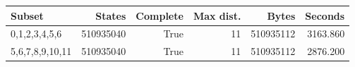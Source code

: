{\small
\begin{tabular}{lrrrrr}
\hline
Subset & States & Complete & Max dist. & Bytes & Seconds \\
\hline
0,1,2,3,4,5,6 & 510935040 & True & 11 & 510935112 & 3163.860 \\
5,6,7,8,9,10,11 & 510935040 & True & 11 & 510935112 & 2876.200 \\
\hline
\end{tabular}
}
